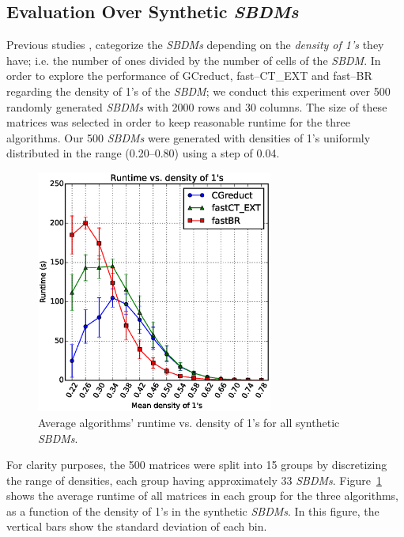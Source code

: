 \documentclass[authoryear,preprint,review,12pt]{elsarticle}
\begin{document}
\subsection{Evaluation Over Synthetic \textit{SBDMs}}\label{sub:synth}

	Previous studies \citep{Rojas12,Lias13,Rodriguez15}, categorize the \textit{SBDMs} depending on the \emph{density of 1's} they have; i.e. the number of ones divided by the number of cells of the \textit{SBDM}. In order to explore the performance of GCreduct, fast--CT\_EXT and fast--BR regarding the density of 1's of the \textit{SBDM}; we conduct this experiment over 500 randomly generated \textit{SBDMs} with 2000 rows and 30 columns. The size of these matrices was selected in order to keep reasonable runtime for the three algorithms. Our 500 \textit{SBDMs} were generated with densities of 1's uniformly distributed in the range (0.20--0.80) using a step of 0.04. 
				
	\begin{figure}[htb]
		\begin{center}
			\includegraphics[height=8cm]{overal.eps}
		\end{center}
		\caption{Average algorithms' runtime vs. density of 1's for all synthetic \textit{SBDMs}.}
		\label{fig:scattDensity}
	\end{figure}	

	For clarity purposes, the 500 matrices were split into 15 groups by discretizing the range of densities, each group having approximately 33 \textit{SBDMs}. Figure~\ref{fig:scattDensity} shows the average runtime of all  matrices in each group for the three algorithms, as a function of the density of 1's in the synthetic \textit{SBDMs}. In this figure, the vertical bars show the standard deviation of each bin. 
		
\end{document}
